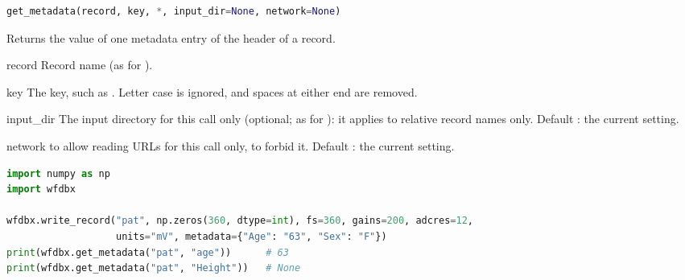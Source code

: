 \begin{lstlisting}[language=Python,style=signature]
get_metadata(record, key, *, input_dir=None, network=None)
\end{lstlisting}
Returns the value of one metadata entry of the header of a record.
\begin{params}
\item[record] Record name (as for ).
\item[key] The key, such as . Letter case is ignored, and spaces at either end
  are removed.
\item[input\_dir] The input directory for this call only (optional; as for
  ): it applies to relative record names only. Default :
  the current setting.
\item[network]  to allow reading URLs for this call only,  to
  forbid it. Default : the current setting.
\end{params}
\begin{lstlisting}[language=Python,style=example]
import numpy as np
import wfdbx

wfdbx.write_record("pat", np.zeros(360, dtype=int), fs=360, gains=200, adcres=12,
                   units="mV", metadata={"Age": "63", "Sex": "F"})
print(wfdbx.get_metadata("pat", "age"))      # 63
print(wfdbx.get_metadata("pat", "Height"))   # None
\end{lstlisting}

